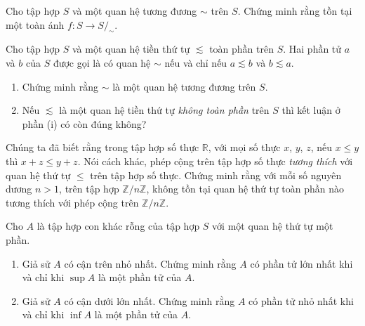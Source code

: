 \begin{exercise}
    Cho tập hợp $S$ và một quan hệ tương đương $\sim$ trên $S$. Chứng minh rằng tồn tại một toàn ánh $f: S\to S/_{\sim}$.
\end{exercise}

\begin{exercise}
    Cho tập hợp $S$ và một quan hệ tiền thứ tự $\lesssim$ toàn phần trên $S$. Hai phần tử $a$ và $b$ của $S$ được gọi là có quan hệ $\sim$ nếu và chỉ nếu $a\lesssim b$ và $b\lesssim a$.
    \begin{enumerate}[label={(\roman*)}]
        \item Chứng minh rằng $\sim$ là một quan hệ tương đương trên $S$.
        \item Nếu $\lesssim$ là một quan hệ tiền thứ tự \textit{không toàn phần} trên $S$ thì kết luận ở phần (i) có còn đúng không?
    \end{enumerate}
\end{exercise}

\begin{exercise}
    Chúng ta đã biết rằng trong tập hợp số thực $\mathbb{R}$, với mọi số thực $x$, $y$, $z$, nếu $x\leq y$ thì $x + z\leq y + z$. Nói cách khác, phép cộng trên tập hợp số thực \textit{tương thích} với quan hệ thứ tự $\leq$ trên tập hợp số thực. Chứng minh rằng với mỗi số nguyên dương $n > 1$, trên tập hợp $\mathbb{Z}/n\mathbb{Z}$, không tồn tại quan hệ thứ tự toàn phần nào tương thích với phép cộng trên $\mathbb{Z}/n\mathbb{Z}$.
\end{exercise}

\begin{exercise}
    Cho $A$ là tập hợp con khác rỗng của tập hợp $S$ với một quan hệ thứ tự một phần.
    \begin{enumerate}[label={(\roman*)}]
        \item Giả sử $A$ có cận trên nhỏ nhất. Chứng minh rằng $A$ có phần tử lớn nhất khi và chỉ khi $\sup A$ là một phần tử của $A$.
        \item Giả sử $A$ có cận dưới lớn nhất. Chứng minh rằng $A$ có phần tử nhỏ nhất khi và chỉ khi $\inf A$ là một phần tử của $A$.
    \end{enumerate}
\end{exercise}
